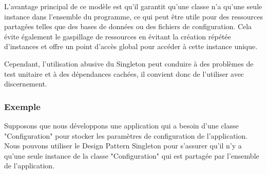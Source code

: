 L'avantage principal de ce modèle est qu'il garantit qu'une classe n'a qu'une seule instance dans l'ensemble du programme, ce qui peut être utile pour des ressources partagées telles que des bases de données ou des fichiers de configuration. Cela évite également le gaspillage de ressources en évitant la création répétée d'instances et offre un point d'accès global pour accéder à cette instance unique.

Cependant, l'utilisation abusive du Singleton peut conduire à des problèmes de test unitaire et à des dépendances cachées, il convient donc de l'utiliser avec discernement.


\subsubsection{Exemple}

Supposons que nous développons une application qui a besoin d'une classe "Configuration" pour stocker les paramètres de configuration de l'application. Nous pouvons utiliser le Design Pattern Singleton pour s'assurer qu'il n'y a qu'une seule instance de la classe "Configuration" qui est partagée par l'ensemble de l'application.



\newpage